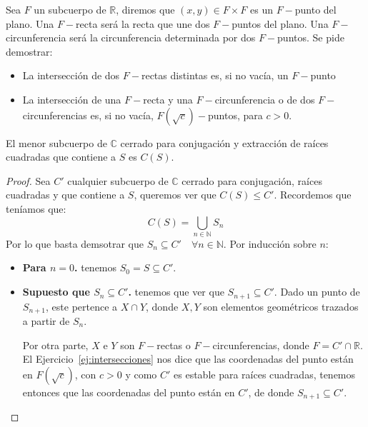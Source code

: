 \begin{ejercicio}\label{ej:intersecciones} %
    Sea $F$ un subcuerpo de $\mathbb{R}$, diremos que $(x,y)\in F\times F$ es un $F-$punto del plano. Una $F-$recta será la recta que une dos $F-$puntos del plano. Una $F-$circunferencia será la circunferencia determinada por dos $F-$puntos. Se pide demostrar:
    \begin{itemize}
        \item La intersección de dos $F-$rectas distintas es, si no vacía, un $F-$punto
        \item La intersección de una $F-$recta y una $F-$circunferencia o de dos $F-$circunferencias es, si no vacía, $F(\sqrt{c})-$puntos, para $c>0$.
    \end{itemize}
\end{ejercicio}

\begin{teo}
    El menor subcuerpo de $\mathbb{C}$ cerrado para conjugación y extracción de raíces cuadradas que contiene a $S$ es $C(S)$.
    \begin{proof}
        Sea $C'$ cualquier subcuerpo de $\mathbb{C}$ cerrado para conjugación, raíces cuadradas y que contiene a $S$, queremos ver que $C(S)\leq C'$. Recordemos que teníamos que:
        \begin{equation*}
            C(S) = \bigcup_{n\in \mathbb{N}} S_n
        \end{equation*}
        Por lo que basta demsotrar que $S_n\subseteq C' \quad \forall n\in \mathbb{N}$. Por inducción sobre $n$:
        \begin{itemize}
            \item \textbf{Para $n=0$.} tenemos $S_0 = S\subseteq C'$.
            \item \textbf{Supuesto que $S_n\subseteq C'$.} tenemos que ver que $S_{n+1}\subseteq C'$. Dado un punto de $S_{n+1}$, este pertence a $X\cap Y$, donde $X,Y$ son elementos geométricos trazados a partir de $S_n$. 

                Por otra parte, $X$ e $Y$ son $F-$rectas o $F-$circunferencias, donde $F=C'\cap \mathbb{R}$. El Ejercicio~\ref{ej:intersecciones} nos dice que las coordenadas del punto están en $F(\sqrt{c})$, con $c>0$ y como $C'$ es estable para raíces cuadradas, tenemos entonces que las coordenadas del punto están en $C'$, de donde $S_{n+1}\subseteq C'$.
        \end{itemize}
    \end{proof}
\end{teo}

